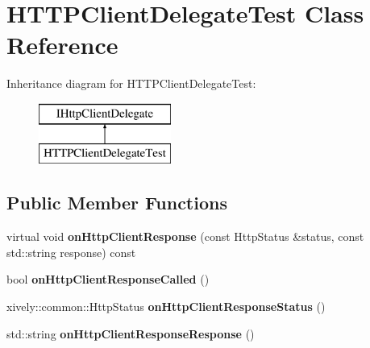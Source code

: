 \hypertarget{class_h_t_t_p_client_delegate_test}{}\section{H\+T\+T\+P\+Client\+Delegate\+Test Class Reference}
\label{class_h_t_t_p_client_delegate_test}
Inheritance diagram for H\+T\+T\+P\+Client\+Delegate\+Test\+:\begin{figure}[H]
\begin{center}
\leavevmode
\includegraphics[height=2.000000cm]{class_h_t_t_p_client_delegate_test}
\end{center}
\end{figure}
\subsection*{Public Member Functions}
\begin{DoxyCompactItemize}
\item 
\hypertarget{class_h_t_t_p_client_delegate_test_af1570e6bd137fb47ff9fc7087eb3100a}{}\label{class_h_t_t_p_client_delegate_test_af1570e6bd137fb47ff9fc7087eb3100a} 
virtual void {\bfseries on\+Http\+Client\+Response} (const Http\+Status \&status, const std\+::string response) const
\item 
\hypertarget{class_h_t_t_p_client_delegate_test_a49964384c94e65a5fcfaf1eb62cd97d7}{}\label{class_h_t_t_p_client_delegate_test_a49964384c94e65a5fcfaf1eb62cd97d7} 
bool {\bfseries on\+Http\+Client\+Response\+Called} ()
\item 
\hypertarget{class_h_t_t_p_client_delegate_test_aab739a25900ac0e5ed4e6700c9543413}{}\label{class_h_t_t_p_client_delegate_test_aab739a25900ac0e5ed4e6700c9543413} 
xively\+::common\+::\+Http\+Status {\bfseries on\+Http\+Client\+Response\+Status} ()
\item 
\hypertarget{class_h_t_t_p_client_delegate_test_a4f808bd16e0e160c155413a8fee7182f}{}\label{class_h_t_t_p_client_delegate_test_a4f808bd16e0e160c155413a8fee7182f} 
std\+::string {\bfseries on\+Http\+Client\+Response\+Response} ()
\end{DoxyCompactItemize}
